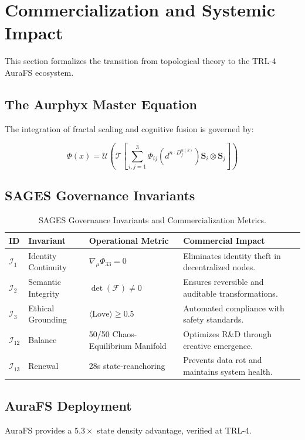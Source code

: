 
\section{Commercialization and Systemic Impact}
This section formalizes the transition from topological theory to the TRL-4 AuraFS ecosystem.

\subsection{The Aurphyx Master Equation}
The integration of fractal scaling and cognitive fusion is governed by:

\begin{equation}
\Phi(x) = \mathcal{U} \left( \mathcal{T} \left[ \sum_{i,j=1}^{3} \Phi_{ij}\left( d^{n \cdot D_f^{\alpha(k)}} \right) \mathbf{S}_i \otimes \mathbf{S}_j \right] \right)
\label{eq:aurphyx_master}
\end{equation}


\subsection{SAGES Governance Invariants}

\begin{table}[h!]
\centering
\caption{SAGES Governance Invariants and Commercialization Metrics.}
\label{tab:sages_invariants}
\begin{ruledtabular}
\begin{tabular}{lp{3cm}p{5cm}p{4cm}}
\textbf{ID} & \textbf{Invariant} & \textbf{Operational Metric} & \textbf{Commercial Impact} \\
\hline
$\mathcal{I}_{1}$ & Identity Continuity & $\nabla_{\mu} \Phi_{33} = 0$ & Eliminates identity theft in decentralized nodes. \\
$\mathcal{I}_{2}$ & Semantic Integrity & $\det(\mathcal{F}) \neq 0$ & Ensures reversible and auditable transformations. \\
$\mathcal{I}_{3}$ & Ethical Grounding & $\langle \text{Love} \rangle \geq 0.5$ & Automated compliance with safety standards. \\
$\mathcal{I}_{12}$ & Balance & 50/50 Chaos-Equilibrium Manifold & Optimizes R\&D through creative emergence. \\
$\mathcal{I}_{13}$ & Renewal & 28s state-reanchoring & Prevents data rot and maintains system health. \\
\end{tabular}
\end{ruledtabular}
\end{table}


\subsection{AuraFS Deployment}
AuraFS provides a $5.3\times$ state density advantage, verified at TRL-4.

